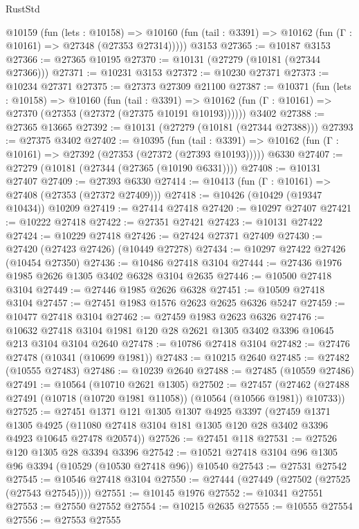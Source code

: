 \begin{lexlean}{RustStd}
\begin{coremodule}
    @10159
      (fun (lets : @10158) =>
      @10160 (fun (tail : @3391) => @10162 (fun (Γ : @10161) => @27348 (@27353 @27314)))))
    @3153
@27365 := @10187 @3153
@27366 := @27365 @10195
@27370 := @10131 (@27279 (@10181 (@27344 @27366)))
@27371 := @10231 @3153
@27372 := @10230 @27371
@27373 := @10234 @27371
@27375 := @27373 @27309 @21100
@27387 := @10371
    (fun (lets : @10158) =>
    @10160
      (fun (tail : @3391) =>
      @10162 (fun (Γ : @10161) => @27370 (@27353 (@27372 (@27375 @10191 @10193))))))
    @3402
@27388 := @27365 @13665
@27392 := @10131 (@27279 (@10181 (@27344 @27388)))
@27393 := @27375 @3402
@27402 := @10395
    (fun (tail : @3391) => @10162 (fun (Γ : @10161) => @27392 (@27353 (@27372 (@27393 @10193)))))
    @6330
@27407 := @27279 (@10181 (@27344 (@27365 (@10190 @6331))))
@27408 := @10131 @27407
@27409 := @27393 @6330
@27414 := @10413 (fun (Γ : @10161) => @27408 (@27353 (@27372 @27409)))
@27418 := @10426 (@10429 (@19347 @10434)) @10209
@27419 := @27414 @27418
@27420 := @10297 @27407
@27421 := @10222 @27418
@27422 := @27351 @27421
@27423 := @10131 @27422
@27424 := @10229 @27418
@27426 := @27424 @27371 @27409
@27430 := @27420 (@27423 @27426) (@10449 @27278)
@27434 := @10297 @27422 @27426 (@10454 @27350)
@27436 := @10486 @27418 @3104
@27444 := @27436 @1976 @1985 @2626 @1305 @3402 @6328 @3104 @2635
@27446 := @10500 @27418 @3104
@27449 := @27446 @1985 @2626 @6328
@27451 := @10509 @27418 @3104
@27457 := @27451 @1983 @1576 @2623 @2625 @6326 @5247
@27459 := @10477 @27418 @3104
@27462 := @27459 @1983 @2623 @6326
@27476 := @10632 @27418 @3104 @1981 @120 @28 @2621 @1305 @3402 @3396 @10645 @213 @3104 @3104 @2640
@27478 := @10786 @27418 @3104
@27482 := @27476 @27478 (@10341 (@10699 @1981))
@27483 := @10215 @2640
@27485 := @27482 (@10555 @27483)
@27486 := @10239 @2640
@27488 := @27485 (@10559 @27486)
@27491 := @10564 (@10710 @2621 @1305)
@27502 := @27457
    (@27462 (@27488 @27491 (@10718 (@10720 @1981 @11058)) (@10564 (@10566 @1981)) @10733))
@27525 := @27451
    @1371
    @121
    @1305
    @1307
    @4925
    @3397
    (@27459
      @1371
      @1305
      @4925
      (@11080 @27418 @3104 @181 @1305 @120 @28 @3402 @3396 @4923 @10645 @27478 @20574))
@27526 := @27451 @118
@27531 := @27526 @120 @1305 @28 @3394 @3396
@27542 := @10521 @27418 @3104 @96 @1305 @96 @3394 (@10529 (@10530 @27418 @96)) @10540
@27543 := @27531 @27542
@27545 := @10546 @27418 @3104
@27550 := @27444 (@27449 (@27502 (@27525 (@27543 @27545))))
@27551 := @10145 @1976
@27552 := @10341 @27551
@27553 := @27550 @27552
@27554 := @10215 @2635
@27555 := @10555 @27554
@27556 := @27553 @27555

\end{coremodule}
\end{lexlean}
